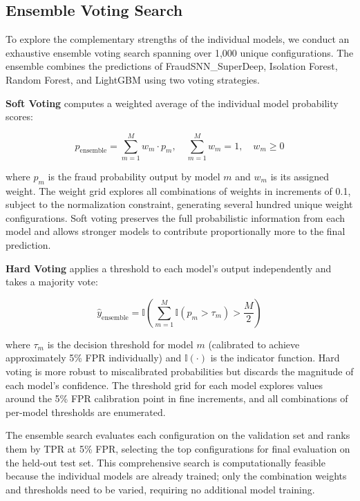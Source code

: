 \subsection{Ensemble Voting Search}

To explore the complementary strengths of the individual models, we conduct an exhaustive ensemble voting search spanning over 1,000 unique configurations. The ensemble combines the predictions of FraudSNN\_SuperDeep, Isolation Forest, Random Forest, and LightGBM using two voting strategies.

\textbf{Soft Voting} computes a weighted average of the individual model probability scores:

\begin{equation}
p_{\text{ensemble}} = \sum_{m=1}^{M} w_m \cdot p_m, \quad \sum_{m=1}^{M} w_m = 1, \quad w_m \geq 0
\label{eq:snn-soft-voting}
\end{equation}

where $p_m$ is the fraud probability output by model $m$ and $w_m$ is its assigned weight. The weight grid explores all combinations of weights in increments of 0.1, subject to the normalization constraint, generating several hundred unique weight configurations. Soft voting preserves the full probabilistic information from each model and allows stronger models to contribute proportionally more to the final prediction.

\textbf{Hard Voting} applies a threshold to each model's output independently and takes a majority vote:

\begin{equation}
\hat{y}_{\text{ensemble}} = \mathbb{I}\left(\sum_{m=1}^{M} \mathbb{I}(p_m > \tau_m) > \frac{M}{2}\right)
\label{eq:snn-hard-voting}
\end{equation}

where $\tau_m$ is the decision threshold for model $m$ (calibrated to achieve approximately 5\% FPR individually) and $\mathbb{I}(\cdot)$ is the indicator function. Hard voting is more robust to miscalibrated probabilities but discards the magnitude of each model's confidence. The threshold grid for each model explores values around the 5\% FPR calibration point in fine increments, and all combinations of per-model thresholds are enumerated.

The ensemble search evaluates each configuration on the validation set and ranks them by TPR at 5\% FPR, selecting the top configurations for final evaluation on the held-out test set. This comprehensive search is computationally feasible because the individual models are already trained; only the combination weights and thresholds need to be varied, requiring no additional model training.

